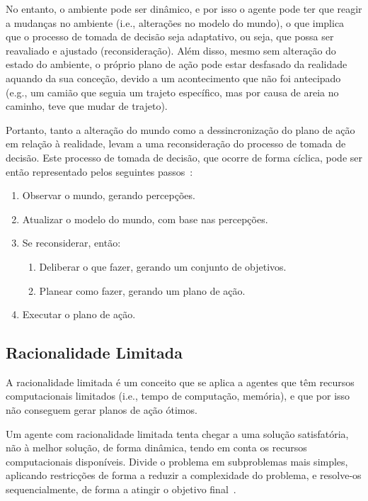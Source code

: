 No entanto, o ambiente pode ser dinâmico, e por isso o agente pode ter que reagir a mudanças no ambiente (i.e., alterações no modelo do mundo), o que implica que o processo de tomada de decisão seja adaptativo, ou seja, que possa ser reavaliado e ajustado (reconsideração).
Além disso, mesmo sem alteração do estado do ambiente, o próprio plano de ação pode estar desfasado da realidade aquando da sua conceção, devido a um acontecimento que não foi antecipado (e.g., um camião que seguia um trajeto específico, mas por causa de areia no caminho, teve que mudar de trajeto).

Portanto, tanto a alteração do mundo como a dessincronização do plano de ação em relação à realidade, levam a uma reconsideração do processo de tomada de decisão.
Este processo de tomada de decisão, que ocorre de forma cíclica, pode ser então representado pelos seguintes passos~\cite{isel:iasa:slides:arq-agentes-deliberativos}:

\begin{enumerate}\label{enum:processo-tomada-decisao}
    \item Observar o mundo, gerando percepções.
    \item Atualizar o modelo do mundo, com base nas percepções.
    \item Se reconsiderar, então:
    \begin{enumerate}
        \item Deliberar o que fazer, gerando um conjunto de objetivos.
        \item Planear como fazer, gerando um plano de ação.
    \end{enumerate}
    \item Executar o plano de ação.
\end{enumerate}

\subsection{Racionalidade Limitada}\label{subsec:racionalidade-limitada}

A racionalidade limitada é um conceito que se aplica a agentes que têm recursos computacionais limitados (i.e., tempo de computação, memória), e que por isso não conseguem gerar planos de ação ótimos.

Um agente com racionalidade limitada tenta chegar a uma solução satisfatória, não à melhor solução, de forma dinâmica, tendo em conta os recursos computacionais disponíveis.
Divide o problema em subproblemas mais simples, aplicando restricções de forma a reduzir a complexidade do problema, e resolve-os sequencialmente, de forma a atingir o objetivo final~\cite{isel:iasa:slides:arq-agentes-deliberativos}.

